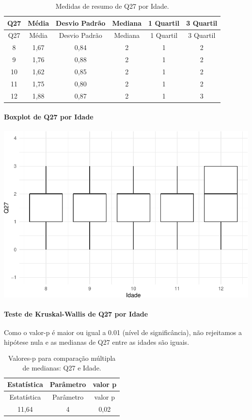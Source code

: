 \documentclass[]{article}
\let\oldparagraph\paragraph
\renewcommand{\paragraph}[1]{\oldparagraph{#1}\mbox{}}
\begin{document}
\begin{longtable}[]{@{}cccccc@{}}
\caption{\label{tab:unnamed-chunk-804}Medidas de resumo de Q27 por Idade.}\tabularnewline
\toprule
Q27 & Média & Desvio Padrão & Mediana & 1 Quartil & 3 Quartil\tabularnewline
\midrule
\endfirsthead
\toprule
Q27 & Média & Desvio Padrão & Mediana & 1 Quartil & 3 Quartil\tabularnewline
\midrule
\endhead
8 & 1,67 & 0,84 & 2 & 1 & 2\tabularnewline
9 & 1,76 & 0,88 & 2 & 1 & 2\tabularnewline
10 & 1,62 & 0,85 & 2 & 1 & 2\tabularnewline
11 & 1,75 & 0,80 & 2 & 1 & 2\tabularnewline
12 & 1,88 & 0,87 & 2 & 1 & 3\tabularnewline
\bottomrule
\end{longtable}

\hypertarget{boxplot-de-q27-por-idade}{%
\paragraph{Boxplot de Q27 por Idade}\label{boxplot-de-q27-por-idade}}

\begin{center}\includegraphics[width=0.75\linewidth]{relatorio_covid19_files/figure-latex/unnamed-chunk-805-1} \end{center}

\hypertarget{teste-de-kruskal-wallis-de-q27-por-idade}{%
\paragraph{Teste de Kruskal-Wallis de Q27 por Idade}\label{teste-de-kruskal-wallis-de-q27-por-idade}}

Como o valor-p é maior ou igual a 0.01 (nível de significância), não rejeitamos a hipótese nula e as medianas de Q27 entre as idades são iguais.

\begin{longtable}[]{@{}ccc@{}}
\caption{\label{tab:unnamed-chunk-807}Valores-p para comparação múltipla de medianas: Q27 e Idade.}\tabularnewline
\toprule
Estatística & Parâmetro & valor p\tabularnewline
\midrule
\endfirsthead
\toprule
Estatística & Parâmetro & valor p\tabularnewline
\midrule
\endhead
11,64 & 4 & 0,02\tabularnewline
\bottomrule
\end{longtable}
\end{document}
